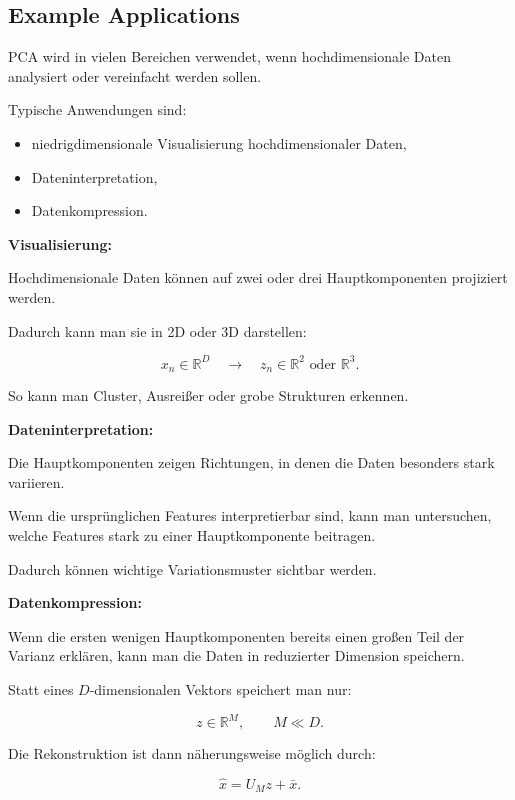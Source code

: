 \documentclass[11pt,a4paper]{scrartcl}
\begin{document}
\subsection{Example Applications}

\begin{notebox}
    PCA wird in vielen Bereichen verwendet, wenn hochdimensionale Daten
    analysiert oder vereinfacht werden sollen.

    Typische Anwendungen sind:

    \begin{itemize}
        \item niedrigdimensionale Visualisierung hochdimensionaler Daten,
        \item Dateninterpretation,
        \item Datenkompression.
    \end{itemize}
\end{notebox}

\begin{solutionbox}
    \textbf{Visualisierung:}

    Hochdimensionale Daten können auf zwei oder drei Hauptkomponenten projiziert
    werden.

    Dadurch kann man sie in 2D oder 3D darstellen:

    \[
        x_n \in \mathbb{R}^D
        \quad \longrightarrow \quad
        z_n \in \mathbb{R}^2
        \text{ oder }
        \mathbb{R}^3.
    \]

    So kann man Cluster, Ausreißer oder grobe Strukturen erkennen.
\end{solutionbox}

\begin{solutionbox}
    \textbf{Dateninterpretation:}

    Die Hauptkomponenten zeigen Richtungen, in denen die Daten besonders stark
    variieren.

    Wenn die ursprünglichen Features interpretierbar sind, kann man untersuchen,
    welche Features stark zu einer Hauptkomponente beitragen.

    Dadurch können wichtige Variationsmuster sichtbar werden.
\end{solutionbox}

\begin{solutionbox}
    \textbf{Datenkompression:}

    Wenn die ersten wenigen Hauptkomponenten bereits einen großen Teil der
    Varianz erklären, kann man die Daten in reduzierter Dimension speichern.

    Statt eines \(D\)-dimensionalen Vektors speichert man nur:

    \[
        z \in \mathbb{R}^M,
        \qquad
        M \ll D.
    \]

    Die Rekonstruktion ist dann näherungsweise möglich durch:

    \[
        \hat x
        =
        U_M z + \bar x.
    \]
\end{solutionbox}
\end{document}

